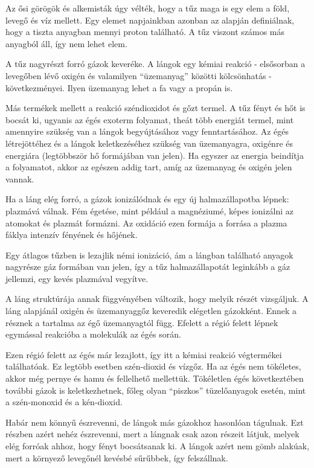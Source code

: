 
Az ősi görögök és alkemisták úgy vélték, hogy a tűz maga is egy elem a föld, levegő és víz mellett. Egy elemet napjainkban azonban az alapján definiálnak, hogy a tiszta anyagban mennyi proton található. A tűz viszont számos más anyagból áll, így nem lehet elem. 

A tűz nagyrészt forró gázok keveréke. A lángok egy kémiai reakció - elsősorban a levegőben lévő oxigén és valamilyen ``üzemanyag'' közötti kölcsönhatás - következményei. Ilyen üzemanyag lehet a fa vagy a propán is.

Más termékek mellett a reakció széndioxidot és gőzt termel. A tűz fényt és hőt is bocsát ki, ugyanis az égés exoterm folyamat, theát több energiát termel, mint amennyire szükség van a lángok begyújtásához vagy fenntartásához. Az égés létrejöttéhez és a lángok keletkezéséhez szükség van üzemanyagra, oxigénre és energiára (legtöbbször hő formájában van jelen). Ha egyszer az energia beindítja a folyamatot, akkor az egészen addig tart, amíg az üzemanyag és oxigén jelen vannak. \cite{firePhysics2}

Ha a láng elég forró, a gázok ionizálódnak és egy új halmazállapotba lépnek: plazmává válnak. Fém égetése, mint például a magnéziumé, képes ionizálni az atomokat és plazmát formázni. Az oxidáció ezen formája a forrása a plazma fáklya intenzív fényének és hőjének.

Egy átlagos tűzben is lezajlik némi ionizáció, ám a lángban található anyagok nagyrésze gáz formában van jelen, így a tűz halmazállapotát leginkább a gáz jellemzi, egy kevés plazmával vegyítve.

A láng struktúrája annak függvényében változik, hogy melyik részét vizsgáljuk. A láng alapjánál oxigén és üzemanyaggőz keveredik elégetlen gázokként. Ennek a résznek a tartalma az égő üzemanyagtól függ. Efelett a régió felett lépnek egymással reakcióba a molekulák az égés során. 

Ezen régió felett az égés már lezajlott, így itt a kémiai reakció végtermékei találhatóak. Ez legtöbb esetben szén-dioxid és vízgőz. Ha az égés nem tökéletes, akkor még pernye és hamu és fellelhető mellettük. Tökéletlen égés következtében további gázok is keletkezhetnek, főleg olyan ``piszkos'' tüzelőanyagok esetén, mint a szén-monoxid és a kén-dioxid.

Habár nem könnyű észrevenni, de lángok más gázokhoz hasonlóan tágulnak. Ezt részben azért nehéz észrevenni, mert a lángnak csak azon részeit látjuk, melyek elég forróak ahhoz, hogy fényt bocsátsanak ki. A lángok azért nem gömb alakúak, mert a környező levegőnél kevésbé sűrűbbek, így felszállnak. 

